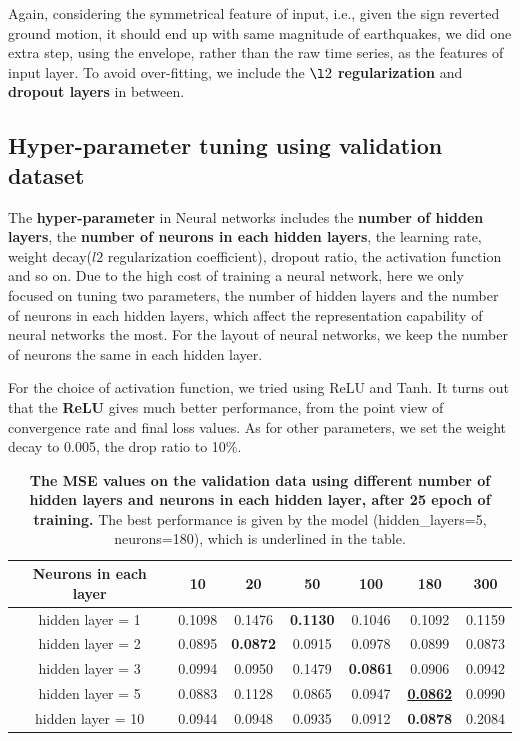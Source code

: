 \documentclass{article} %
\begin{document}
Again, considering the symmetrical feature of input, i.e., given the sign reverted ground motion, it should end up with same magnitude of earthquakes, we did one extra step, using the envelope, rather than the raw time series, as the features of input layer. To avoid over-fitting, we include the \textbf{$\l2$ regularization} and \textbf{dropout layers} in between.

\subsection{Hyper-parameter tuning using validation dataset}
The \textbf{hyper-parameter} in Neural networks includes the \textbf{number of hidden layers}, the \textbf{number of neurons in each hidden layers}, the learning rate, weight decay($l2$ regularization coefficient), dropout ratio, the activation function and so on. Due to the high cost of training a neural network, here we only focused on tuning two parameters, the number of hidden layers and the number of neurons in each hidden layers, which affect the representation capability of neural networks the most. For the layout of neural networks, we keep the number of neurons the same in each hidden layer.

For the choice of activation function, we tried using ReLU and Tanh. It turns out that the \textbf{ReLU} gives much better performance, from the point view of convergence rate and final loss values. As for other parameters, we set the weight decay to 0.005, the drop ratio to 10\%.



\begin{table}[htbp]
	\small
	\centering
	\begin{tabular}{@{}|c|c|c|c|c|c|c|@{}} %
		\hline
		Neurons in each layer & 10 & 20 & 50 & 100 & 180 & 300\\ 
		\cline{1-7} \hline \hline
		hidden layer = 1 & 0.1098 & 0.1476 & \textbf{0.1130} & 0.1046  & 0.1092 & 0.1159 \\
		
		hidden layer = 2 & 0.0895  & \textbf{0.0872} & 0.0915 & 0.0978 & 0.0899 & 0.0873 \\ 
		hidden layer = 3 &  0.0994 & 0.0950 & 0.1479 & \textbf{0.0861} & 0.0906  & 0.0942 \\ 
		 hidden layer = 5 & 0.0883 & 0.1128 & 0.0865 & 0.0947 & \textbf{\underline{0.0862}}  & 0.0990\\ 
		 hidden layer = 10 & 0.0944 & 0.0948 & 0.0935 & 0.0912 & \textbf{0.0878} & 0.2084  \\ \hline
	\end{tabular}
	\caption{{\bf The MSE values on the validation data using different number of hidden layers and neurons in each hidden layer, after 25 epoch of training.} The best performance is given by the model (hidden\_layers=5, neurons=180), which is underlined in the table.}
	\label{tab:nn_cv}
\end{table}
\end{document}
